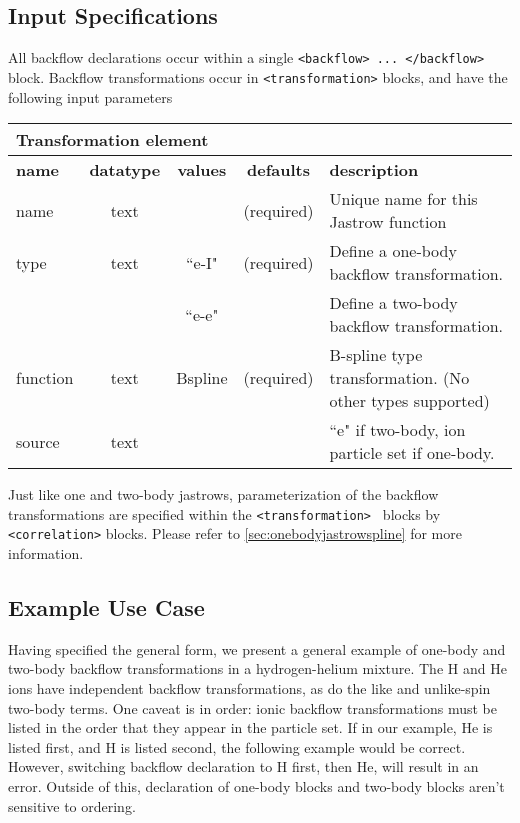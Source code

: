 \subsection{Input Specifications}
All backflow declarations occur within a single \texttt{<backflow> ... </backflow>} block.  Backflow transformations occur in \texttt{<transformation>} blocks, and have the following input parameters

\begin{table}[h]
\begin{center}
\begin{tabular}{l c c c l }
\hline
\multicolumn{5}{l}{Transformation element} \\
\hline
\bfseries name & \bfseries datatype & \bfseries values & \bfseries defaults  & \bfseries description \\
\hline
name & text &  & (required) & Unique name for this Jastrow function \\
type & text & ``e-I" & (required) & Define a one-body backflow transformation. \\ 
        &          & ``e-e" & & Define a two-body backflow transformation. \\
function & text & Bspline & (required) & B-spline type transformation. (No other types supported) \\
source & text &  &  & ``e" if two-body, ion particle set if one-body.\\ 
  \hline
\end{tabular}
\end{center}
\end{table}

Just like one and two-body jastrows, parameterization of the backflow transformations are specified within the \texttt{<transformation> } blocks by  \texttt{<correlation>} blocks.  Please refer to \ref{sec:onebodyjastrowspline} for more information.

\subsection{Example Use Case}
Having specified the general form, we present a general example of one-body and two-body backflow transformations in a hydrogen-helium mixture.  The H and He ions have independent backflow transformations, as do the like and unlike-spin two-body terms.  One caveat is in order:  ionic backflow transformations must be listed in the order that they appear in the particle set.  If in our example, He is listed first, and H is listed second, the following example would be correct.  However, switching backflow declaration to H first, then He, will result in an error.  Outside of this, declaration of one-body blocks and two-body blocks aren't sensitive to ordering.  

